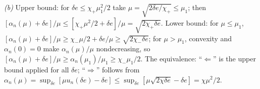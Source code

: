 \documentclass[aps,prx,onecolumn,10pt,nofootinbib,longbibliography,floatfix]{revtex4-2}
\theoremstyle{remark}
\newcommand{\de}{\delta e}
\begin{document}
\emph{(b)} Upper bound: for $\de\le\chi_+\mu_1^2/2$ take $\mu=\sqrt{2\de/\chi_+}\le\mu_1$; then %
$[\alpha_n(\mu)+\de]/\mu\le[\chi_+\mu^2/2+\de]/\mu=\sqrt{2\chi_+\de}$. Lower bound: for $\mu\le\mu_1$, %
$[\alpha_n(\mu)+\de]/\mu\ge\chi_-\mu/2+\de/\mu\ge\sqrt{2\chi_-\de}$; for $\mu>\mu_1$, convexity and $\alpha_n(0)=0$ %
make $\alpha_n(\mu)/\mu$ nondecreasing, so $[\alpha_n(\mu)+\de]/\mu\ge\alpha_n(\mu_1)/\mu_1\ge\chi_-\mu_1/2$. The %
equivalence: ``$\Leftarrow$'' is the upper bound applied for all $\de$; ``$\Rightarrow$'' follows from
$\alpha_n(\mu)=\sup_{\de}[\mu u_n(\de)-\de]\le\sup_{\de}[\mu\sqrt{2\chi\de}-\de]=\chi\mu^2/2$. %
\end{document}
